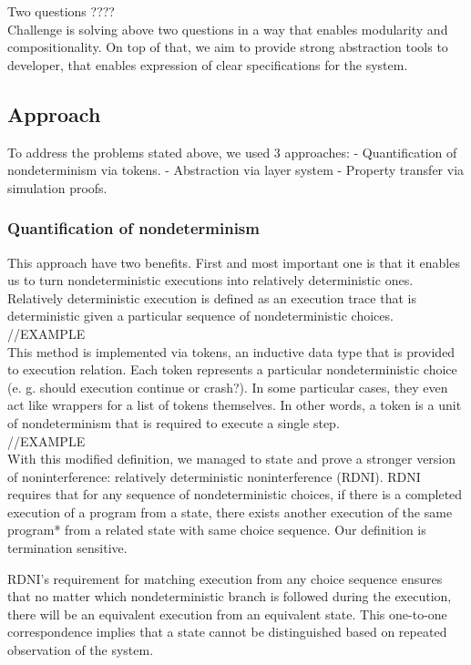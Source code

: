 \documentclass[onecolumn]{paper}
\begin{document}
Two questions ????\\

Challenge is solving above two questions in a way that enables modularity and compositionality. On top of that, we aim to provide strong abstraction tools to developer, that enables expression of clear specifications for the system.

\subsection*{Approach}
To address the problems stated above, we used 3 approaches:
- Quantification of nondeterminism via tokens.
- Abstraction via layer system
- Property transfer via simulation proofs.

\subsubsection*{Quantification of nondeterminism}
This approach have two benefits. First and most important one is that it enables us to
turn nondeterministic executions into relatively deterministic ones. 
Relatively deterministic execution is defined as an execution trace that is deterministic given a particular sequence of nondeterministic choices.\\

//EXAMPLE\\

This method is implemented via tokens, an inductive data type that is provided to execution relation. Each token represents a particular nondeterministic choice (e. g. should execution continue or crash?). In some particular cases, they even act like wrappers for a list of tokens themselves. In other words, a token is a unit of nondeterminism that is required to execute a single step.\\

//EXAMPLE\\

With this modified definition, we managed to state and prove a stronger version of noninterference: relatively deterministic noninterference (RDNI). RDNI requires that for any sequence of nondeterministic choices, if there is a completed execution of a program from a state, there exists another execution of the same program* from a related state with same choice sequence. Our definition is termination sensitive.

RDNI's requirement for matching execution from any choice sequence ensures that no matter which nondeterministic branch is followed during the execution, there will be an equivalent execution from an equivalent state. This one-to-one correspondence implies that a state cannot be distinguished based on repeated observation of the system.
\end{document}
